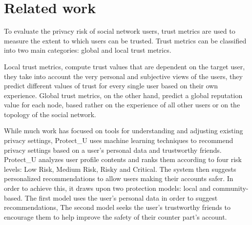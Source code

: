 \section{Related work}

To evaluate the privacy risk of social network users,
	trust metrics are used to measure the extent to which users can be trusted.
Trust metrics can be classified into two main categories:
	global and local trust metrics.

Local trust metrics,
	compute trust values that are dependent on the target user,
	they take into account the very personal and subjective views of the users,
	they predict different values of trust for every single user based on their own experience.
Global trust metrics,
	on the other hand,
	predict a global reputation value for each node,
	based rather on the experience of all other users or on the topology of the social network.


While much work has focused on tools for understanding and adjusting existing privacy settings,
	Protect\_U \cite{gandouz_protect_2012} uses machine learning techniques to recommend privacy settings based on a user’s personal data and trustworthy friends.
Protect\_U analyzes user profile contents and ranks them according to four risk levels: Low Risk, Medium Risk, Risky and Critical.
The system then suggests personalized recommendations to allow users making their accounts safer.
In order to achieve this,
	it draws upon two protection models: local and community-based.
The first model uses the user’s personal data in order to suggest recommendations,
The second model seeks the user’s trustworthy friends to encourage them to help improve the safety of their counter part’s account.

